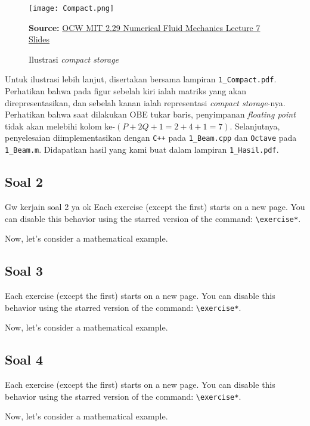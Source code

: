 \documentclass[12pt, a4paper, onecolumn, oneside, final]{report}
\begin{document}
\begin{figure}[h]
  \centering
    \texttt{[image: Compact.png]}
  \caption{Ilustrasi \textit{compact storage}}
  \textbf{Source:}  \href{https://ocw.mit.edu/courses/mechanical-engineering/2-29-numerical-fluid-mechanics-spring-2015/lecture-notes-and-references/MIT2_29S15_Lecture7.pdf}{OCW MIT 2.29 Numerical Fluid Mechanics Lecture 7 Slides}
\end{figure}

Untuk ilustrasi lebih lanjut, disertakan bersama lampiran \texttt{1\_Compact.pdf}. Perhatikan bahwa pada figur sebelah kiri ialah matriks yang akan direpresentasikan, dan sebelah kanan ialah representasi \textit{compact storage}-nya. Perhatikan bahwa saat dilakukan OBE tukar baris, penyimpanan \textit{floating point} tidak akan melebihi kolom ke-$(P+2Q+1 = 2 + 4 + 1 = 7)$. Selanjutnya, penyelesaian diimplementasikan dengan \texttt{C++} pada \texttt{1\_Beam.cpp} dan \texttt{Octave} pada \texttt{1\_Beam.m}. Didapatkan hasil yang kami buat dalam lampiran \texttt{1\_Hasil.pdf}.

\subsection*{Soal 2}
Gw kerjain soal 2 ya ok
Each exercise (except the first) starts on a new page. You can disable this behavior using the starred version of the command: \verb|\exercise*|.

Now, let's consider a mathematical example.

\subsection*{Soal 3}
Each exercise (except the first) starts on a new page. You can disable this behavior using the starred version of the command: \verb|\exercise*|.

Now, let's consider a mathematical example.

\subsection*{Soal 4}
Each exercise (except the first) starts on a new page. You can disable this behavior using the starred version of the command: \verb|\exercise*|.

Now, let's consider a mathematical example.

\nocite{*}


\end{document}
